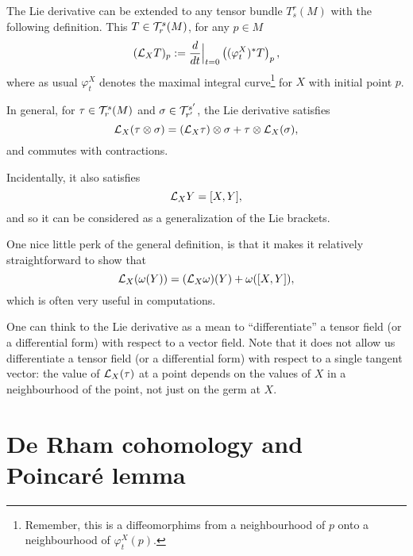 \begin{remark}
  The Lie derivative can be extended to any tensor bundle $T_s^r(M)$ with the following definition.
  This $T\in\mathcal{T}_r^s(M)$, for any $p\in M$
  \begin{equation}
    (\mathcal{L}_X T)_p := \frac{d}{dt}\Big|_{t=0}\left((\varphi_t^X)^* T\right)_p,
  \end{equation}
  where as usual $\varphi_t^X$ denotes the maximal integral curve\footnote{Remember, this is a diffeomorphims from a neighbourhood of $p$ onto a neighbourhood of $\varphi_t^X(p)$.} for $X$ with initial point $p$.

  In general, for $\tau\in\mathcal{T}_r^s(M)$ and $\sigma\in\mathcal{T}_{r'}^{s'}$, the Lie derivative satisfies
  \begin{equation}
    \mathcal{L}_X(\tau\otimes\sigma) = (\mathcal{L}_X\tau)\otimes\sigma + \tau\otimes\mathcal{L}_X(\sigma),
  \end{equation}
  and commutes with contractions.

  Incidentally, it also satisfies
  \begin{equation}
    \mathcal{L}_XY = [X,Y],
  \end{equation}
  and so it can be considered as a generalization of the Lie brackets.

  One nice little perk of the general definition, is that it makes it relatively straightforward to show that
  \begin{equation}\label{eq:cLXwBrackets}
    \mathcal{L}_X(\omega(Y)) = (\mathcal{L}_X\omega)(Y) + \omega([X,Y]),
  \end{equation}
  which is often very useful in computations.

  One can think to the Lie derivative as a mean to ``differentiate'' a tensor field (or a differential form) with respect to a vector field.
  Note that it does not allow us differentiate a tensor field (or a differential form) with respect to a single tangent vector: the value of $\mathcal{L}_X(\tau)$ at a point depends on the values of $X$ in a neighbourhood of the point, not just on the germ at $X$.
\end{remark}

\section{De Rham cohomology and Poincar\'e lemma}

